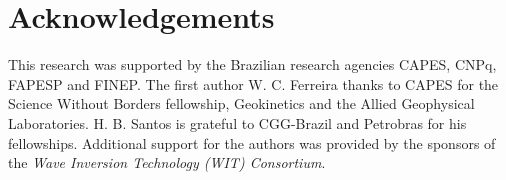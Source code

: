 \documentclass{vie16}
\begin{document}
\section{Acknowledgements}
This research was supported by the Brazilian research agencies CAPES, CNPq, 
FAPESP and FINEP. The first author W. C. Ferreira thanks to CAPES for the 
Science Without Borders fellowship, Geokinetics and the Allied Geophysical 
Laboratories. H. B. Santos is grateful to CGG-Brazil and Petrobras for his 
fellowships. Additional support for the authors was provided by the 
sponsors of the \textit{Wave Inversion Technology (WIT) Consortium}.


\end{document}
